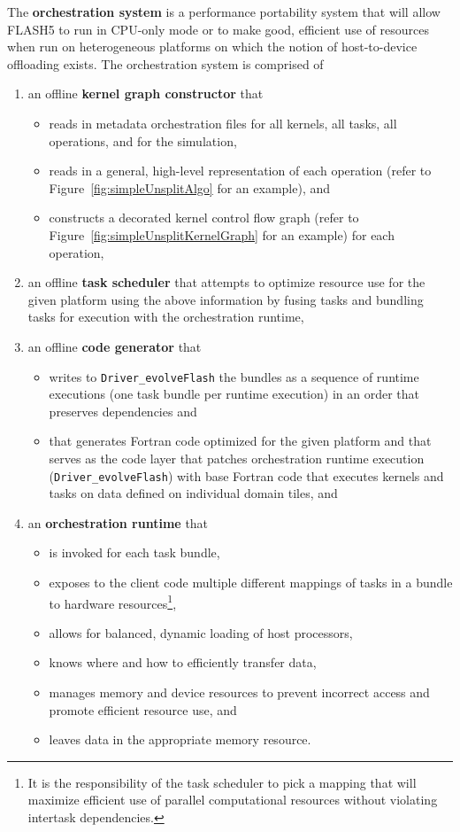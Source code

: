 \documentclass{article}
\begin{document}
The \textbf{orchestration system} is a performance portability system that will
allow FLASH5 to run in CPU-only mode or to make good, efficient use of resources
when run on heterogeneous platforms on which the notion of host-to-device
offloading exists. The orchestration system is comprised of
\begin{enumerate}
\item{an offline \textbf{kernel graph constructor} that}
    \begin{itemize}
    \item{reads in metadata orchestration files for all kernels, all tasks, all
    operations, and for the simulation,}
    \item{reads in a general, high-level representation of each operation (refer
    to Figure~\ref{fig:simpleUnsplitAlgo} for an example), and}
    \item{constructs a decorated kernel control flow graph (refer to
    Figure~\ref{fig:simpleUnsplitKernelGraph} for an example) for each operation,}
    \end{itemize}
\item{an offline \textbf{task scheduler} that attempts to optimize resource use
for the given platform using the above information by fusing tasks and bundling
tasks for execution with the orchestration runtime,}
\item{an offline \textbf{code generator} that}
    \begin{itemize}
    \item{writes to \texttt{Driver\_evolveFlash} the bundles as a sequence of runtime executions (one task
    bundle per runtime execution) in an order that preserves dependencies and}
    \item{that generates Fortran code optimized for the given platform and that
    serves as the code layer that patches orchestration runtime execution
    (\texttt{Driver\_evolveFlash}) with base Fortran code that executes kernels
    and tasks on data defined on individual domain tiles, and}
    \end{itemize}
\item{an \textbf{orchestration runtime} that}
    \begin{itemize}
    \item{is invoked for each task bundle,}
    \item{exposes to the client code multiple different mappings of tasks in a
    bundle to hardware resources\footnote{It is the responsibility of the task
    scheduler to pick a mapping that will maximize efficient use of parallel
    computational resources without violating intertask dependencies.},}
    \item{allows for balanced, dynamic loading of host processors,}
    \item{knows where and how to efficiently transfer data,}
    \item{manages memory and device resources to prevent incorrect access and
    promote efficient resource use, and}
    \item{leaves data in the appropriate memory resource.}
    \end{itemize}
\end{enumerate}
\end{document}
